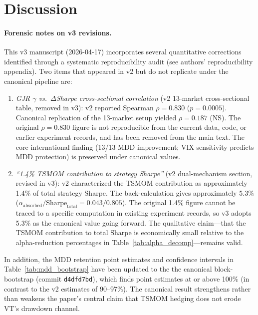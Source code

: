 \section{Discussion}
\label{sec:discussion}

\paragraph{Forensic notes on v3 revisions.} This v3 manuscript (2026-04-17) incorporates several quantitative corrections identified through a systematic reproducibility audit (see authors' reproducibility appendix). Two items that appeared in v2 but do not replicate under the canonical pipeline are:
\begin{enumerate}
\item \emph{GJR $\gamma$ vs.\ $\Delta$Sharpe cross-sectional correlation} (v2 13-market cross-sectional table, removed in v3): v2 reported Spearman $\rho = 0.830$ ($p = 0.0005$). Canonical replication of the 13-market setup yielded $\rho = 0.187$ (NS). The original $\rho = 0.830$ figure is not reproducible from the current data, code, or earlier experiment records, and has been removed from the main text. The core international finding (13/13 MDD improvement; VIX sensitivity predicts MDD protection) is preserved under canonical values.
\item \emph{``1.4\% TSMOM contribution to strategy Sharpe''} (v2 dual-mechanism section, revised in v3): v2 characterized the TSMOM contribution as approximately 1.4\% of total strategy Sharpe. The back-calculation gives approximately 5.3\% ($\alpha_{\text{absorbed}}/\text{Sharpe}_{\text{total}} = 0.043/0.805$). The original 1.4\% figure cannot be traced to a specific computation in existing experiment records, so v3 adopts 5.3\% as the canonical value going forward. The qualitative claim---that the TSMOM contribution to total Sharpe is economically small relative to the alpha-reduction percentages in Table~\ref{tab:alpha_decomp}---remains valid.
\end{enumerate}
In addition, the MDD retention point estimates and confidence intervals in Table~\ref{tab:mdd_bootstrap} have been updated to the the canonical block-bootstrap (commit \texttt{d4dfd7bd}), which finds point estimates at or above 100\% (in contrast to the v2 estimates of 90--97\%). The canonical result strengthens rather than weakens the paper's central claim that TSMOM hedging does not erode VT's drawdown channel.

